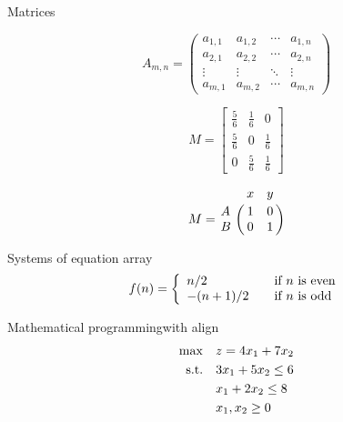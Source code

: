 \begin{frame}{Matrices}
    \begin{small}
        $$
            A_{m,n} =
            \begin{pmatrix}
                a_{1,1} & a_{1,2} & \cdots & a_{1,n} \\
                a_{2,1} & a_{2,2} & \cdots & a_{2,n} \\
                \vdots  & \vdots  & \ddots & \vdots  \\
                a_{m,1} & a_{m,2} & \cdots & a_{m,n}
            \end{pmatrix}
        $$

        $$
            M =
            \begin{bmatrix}
                \frac{5}{6} & \frac{1}{6} & 0           \\[0.3em]
                \frac{5}{6} & 0           & \frac{1}{6} \\[0.3em]
                0           & \frac{5}{6} & \frac{1}{6}
            \end{bmatrix}
        $$

        $$
            M = \bordermatrix{~ & x & y \cr
                              A & 1 & 0 \cr
                              B & 0 & 1 \cr}
        $$
    \end{small}
\end{frame}
\note{
}


\begin{frame}{Systems of equation array}
    \[
        f(n) = \left\{
        \begin{array}{l l}
            n/2      & \quad \text{if $n$ is even}\\
            -(n+1)/2 & \quad \text{if $n$ is odd}
        \end{array} \right.
    \]
\end{frame}
\note{
}


\begin{frame}{Mathematical programming}{with align}
    \begin{align}
        \max        & \quad z = 4 x_1 + 7 x_2    \notag \\
        \text{s.t.} & \quad 3 x_1 + 5 x_2 \leq 6 \label{constraint1}\\
                    & \quad   x_1 + 2 x_2 \leq 8 \label{constraint2}\\
                    & \quad   x_1, x_2 \geq 0    \notag
    \end{align}
\end{frame}
\note{
}


